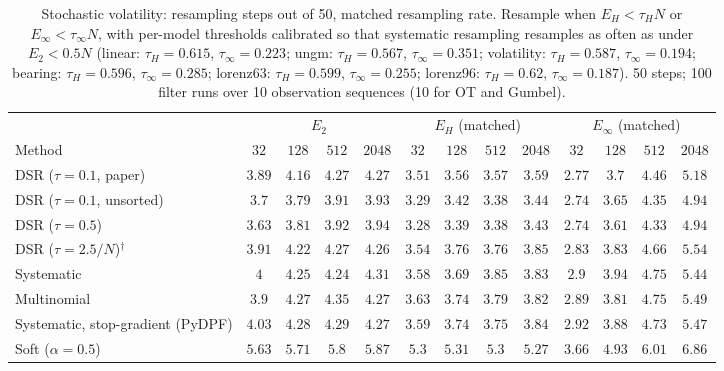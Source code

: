 \begin{table}[ht]
\centering
\small
\caption{Stochastic volatility: resampling steps out of 50, matched resampling rate. Resample when $E_H<\tau_HN$ or $E_\infty<\tau_\infty N$, with per-model thresholds calibrated so that systematic resampling resamples as often as under $E_2<0.5N$ (linear: $\tau_H{=}0.615$, $\tau_\infty{=}0.223$; ungm: $\tau_H{=}0.567$, $\tau_\infty{=}0.351$; volatility: $\tau_H{=}0.587$, $\tau_\infty{=}0.194$; bearing: $\tau_H{=}0.596$, $\tau_\infty{=}0.285$; lorenz63: $\tau_H{=}0.599$, $\tau_\infty{=}0.255$; lorenz96: $\tau_H{=}0.62$, $\tau_\infty{=}0.187$). 50 steps; 100 filter runs over 10 observation sequences (10 for OT and Gumbel).}
\label{tab:trigger-matched-volatility-resampling_steps}
\begin{adjustbox}{max width=\linewidth}
\begin{tabular}{lcccc|cccc|cccc}
\toprule
 & \multicolumn{4}{c}{$E_2$} & \multicolumn{4}{c}{$E_H$ (matched)} & \multicolumn{4}{c}{$E_\infty$ (matched)} \\
\cmidrule(lr){2-5} \cmidrule(lr){6-9} \cmidrule(lr){10-13}
Method & $32$ & $128$ & $512$ & $2048$ & $32$ & $128$ & $512$ & $2048$ & $32$ & $128$ & $512$ & $2048$ \\
\midrule
DSR ($\tau{=}0.1$, paper) & $3.89$ & $4.16$ & $4.27$ & $4.27$ & $3.51$ & $3.56$ & $3.57$ & $3.59$ & $2.77$ & $3.7$ & $4.46$ & $5.18$ \\
DSR ($\tau{=}0.1$, unsorted) & $3.7$ & $3.79$ & $3.91$ & $3.93$ & $3.29$ & $3.42$ & $3.38$ & $3.44$ & $2.74$ & $3.65$ & $4.35$ & $4.94$ \\
DSR ($\tau{=}0.5$) & $3.63$ & $3.81$ & $3.92$ & $3.94$ & $3.28$ & $3.39$ & $3.38$ & $3.43$ & $2.74$ & $3.61$ & $4.33$ & $4.94$ \\
DSR ($\tau{=}2.5/N$)$^\dagger$ & $3.91$ & $4.22$ & $4.27$ & $4.26$ & $3.54$ & $3.76$ & $3.76$ & $3.85$ & $2.83$ & $3.83$ & $4.66$ & $5.54$ \\
\midrule
Systematic & $4$ & $4.25$ & $4.24$ & $4.31$ & $3.58$ & $3.69$ & $3.85$ & $3.83$ & $2.9$ & $3.94$ & $4.75$ & $5.44$ \\
Multinomial & $3.9$ & $4.27$ & $4.35$ & $4.27$ & $3.63$ & $3.74$ & $3.79$ & $3.82$ & $2.89$ & $3.81$ & $4.75$ & $5.49$ \\
Systematic, stop-gradient (PyDPF) & $4.03$ & $4.28$ & $4.29$ & $4.27$ & $3.59$ & $3.74$ & $3.75$ & $3.84$ & $2.92$ & $3.88$ & $4.73$ & $5.47$ \\
Soft ($\alpha{=}0.5$) & $5.63$ & $5.71$ & $5.8$ & $5.87$ & $5.3$ & $5.31$ & $5.3$ & $5.27$ & $3.66$ & $4.93$ & $6.01$ & $6.86$ \\

\end{tabular}
\end{adjustbox}
\end{table}
